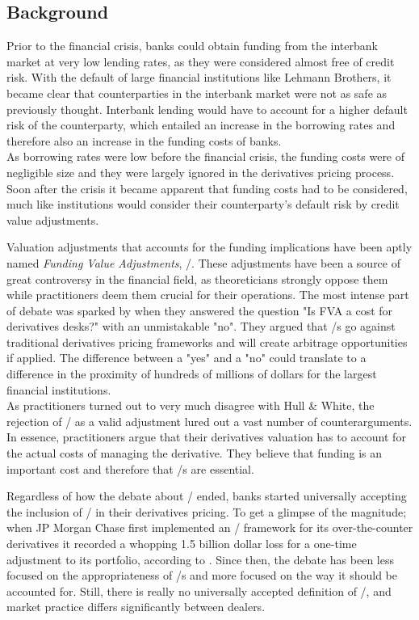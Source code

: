 \documentclass[main.tex]{subfiles}
\begin{document}
    \subsection{Background}
        
    Prior to the financial crisis, banks could obtain funding from the interbank market
    at very low lending rates, as they were considered almost free of credit risk.
    With the default of large financial institutions like Lehmann Brothers, 
    it became clear that counterparties in the interbank market 
    were not as safe as previously thought.
    Interbank lending would have to account for a higher default risk of the counterparty,
    which entailed an increase in the borrowing rates 
    and therefore also an increase in the funding costs of banks.
    \\
    As borrowing rates were low before the financial crisis, 
    the funding costs were of negligible size 
    and they were largely ignored in the derivatives pricing process.
    Soon after the crisis it became apparent that funding costs had to be considered,
    much like institutions would consider their counterparty's default risk by 
    credit value adjustments.

    Valuation adjustments that accounts for the funding implications 
    have been aptly named \textit{Funding Value Adjustments}, \FVA/.
    These adjustments have been a source of great controversy in the financial field,
    as theoreticians strongly oppose them while practitioners deem them crucial for their operations.
    The most intense part of debate was sparked by \textcite{HullWhite2012FVA}
    when they answered the question "Is FVA a cost for derivatives desks?" 
    with an unmistakable "no".
    They argued that \FVA/s go against traditional derivatives pricing frameworks
    and will create arbitrage opportunities if applied.
    The difference between a "yes" and a "no" could translate to a difference 
    in the proximity of hundreds of millions of dollars for the largest financial institutions.
    \\
    As practitioners turned out to very much disagree with Hull \& White,
    the rejection of \FVA/ as a valid adjustment lured out a vast number of counterarguments.
    In essence, practitioners argue that their derivatives valuation 
    has to account for the actual costs of managing the derivative.
    They believe that funding is an important cost and therefore that \FVA/s are essential.

    Regardless of how the debate about \FVA/ ended, banks started universally accepting the inclusion of \FVA/
    in their derivatives pricing.
    To get a glimpse of the magnitude; when JP Morgan Chase first implemented an \FVA/ framework
    for its over-the-counter derivatives it recorded a whopping 1.5 billion dollar loss
    for a one-time adjustment to its portfolio, according to \textcite{JPMorganEarnings}.
    Since then, the debate has been less focused on the appropriateness of \FVA/s
    and more focused on the way it should be accounted for.
    Still, there is really no universally accepted definition of \FVA/,
    and market practice differs significantly between dealers.
\end{document}
